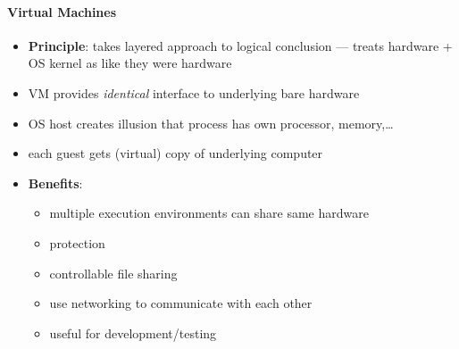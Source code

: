 \paragraph{Virtual Machines}
\begin{itemize}
  \item \textbf{Principle}: takes layered approach to logical conclusion --- treats hardware + OS kernel as like they were hardware
  \item VM provides \emph{identical} interface to underlying bare hardware
  \item OS host creates illusion that process has own processor, memory,\dots
  \item each guest gets (virtual) copy of underlying computer
  \item \textbf{Benefits}:
  \begin{itemize}
    \item multiple execution environments can share same hardware 
    \item protection 
    \item controllable file sharing 
    \item use networking to communicate with each other 
    \item useful for development/testing
  \end{itemize}
\end{itemize}